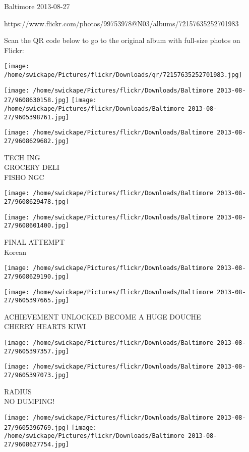 \documentclass[10pt,letterpaper]{article}
\begin{document}
Baltimore 2013-08-27

https://www.flickr.com/photos/99753978@N03/albums/72157635252701983

Scan the QR code below to go to the original album with full-size photos on Flickr:

\texttt{[image: /home/swickape/Pictures/flickr/Downloads/qr/72157635252701983.jpg]}
\pagebreak

\texttt{[image: /home/swickape/Pictures/flickr/Downloads/Baltimore 2013-08-27/9608630158.jpg]}
\texttt{[image: /home/swickape/Pictures/flickr/Downloads/Baltimore 2013-08-27/9605398761.jpg]}

\texttt{[image: /home/swickape/Pictures/flickr/Downloads/Baltimore 2013-08-27/9608629682.jpg]}

TECH ING\\
GROCERY DELI\\
FISHO NGC
\pagebreak

\texttt{[image: /home/swickape/Pictures/flickr/Downloads/Baltimore 2013-08-27/9608629478.jpg]}

\vspace{0.25in}
\texttt{[image: /home/swickape/Pictures/flickr/Downloads/Baltimore 2013-08-27/9608601400.jpg]}

FINAL ATTEMPT\\
Korean
\pagebreak

\texttt{[image: /home/swickape/Pictures/flickr/Downloads/Baltimore 2013-08-27/9608629190.jpg]}

\vspace{0.25in}
\texttt{[image: /home/swickape/Pictures/flickr/Downloads/Baltimore 2013-08-27/9605397665.jpg]}

ACHIEVEMENT UNLOCKED BECOME A HUGE DOUCHE\\
CHERRY HEARTS KIWI
\pagebreak

\texttt{[image: /home/swickape/Pictures/flickr/Downloads/Baltimore 2013-08-27/9605397357.jpg]}

\vspace{0.25in}
\texttt{[image: /home/swickape/Pictures/flickr/Downloads/Baltimore 2013-08-27/9605397073.jpg]}

RADIUS\\
NO DUMPING!
\pagebreak

\texttt{[image: /home/swickape/Pictures/flickr/Downloads/Baltimore 2013-08-27/9605396769.jpg]}
\texttt{[image: /home/swickape/Pictures/flickr/Downloads/Baltimore 2013-08-27/9608627754.jpg]}
\end{document}
